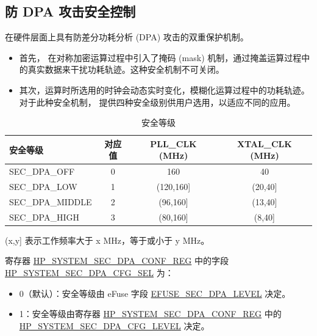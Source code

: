 \documentclass[main\_\_CN.tex]{subfiles}
\begin{document}
\subsection{防 DPA 攻击安全控制}
\label{sec:sysreg-anti-dpa-attack-security-control}

\chipname{} 在硬件层面上具有防差分功耗分析 (DPA) 攻击的双重保护机制。

\begin{itemize}
    \item 首先，\chipname{} 在对称加密运算过程中引入了掩码 (mask) 机制，通过掩盖运算过程中的真实数据来干扰功耗轨迹。这种安全机制不可关闭。
    \item 其次，运算时所选用的时钟会动态实时变化，模糊化运算过程中的功耗轨迹。对于此种安全机制，\chipname{} 提供四种安全级别供用户选用，以适应不同的应用。
\end{itemize}

\begin{table}[H]
    \centering
    \caption{安全等级}
    \label{tab:sysreg-security-level}
    \begin{threeparttable}
    \begin{tabular}[c]{| l | c | c | c |}
    \hline
    \rowcolor{lightgray}
        \textbf{安全等级} & \textbf{对应值} & \textbf{PLL\_CLK (MHz)} & \textbf{XTAL\_CLK (MHz)} \\ \hline
        SEC\_DPA\_OFF       & 0    & 160           & 40          \\\hline
        SEC\_DPA\_LOW       & 1    & (120,160]\tnote{A}   & (20,40]\tnote{A}   \\\hline
        SEC\_DPA\_MIDDLE    & 2    & (96,160]\tnote{A}    & (13,40]\tnote{A} \\\hline
        SEC\_DPA\_HIGH      & 3    & (80,160]\tnote{A}    & (8,40]\tnote{A}   \\\hline
    \end{tabular}
    \begin{tablenotes}
        \item[A] (x,y] 表示工作频率大于 x MHz，等于或小于 y MHz。
    \end{tablenotes}
    \end{threeparttable}
\end{table}

寄存器 \hyperref[regdesc:HPSYSTEMSECDPACONFREG]{HP\_SYSTEM\_SEC\_DPA\_CONF\_REG} 中的字段 \hyperref[fielddesc:HPSYSTEMSECDPALEVEL]{HP\_SYSTEM\_SEC\_DPA\_CFG\_SEL} 为：
\begin{itemize}
    \item 0（默认）：安全等级由 eFuse 字段 \hyperref[fielddesc:EFUSESECDPALEVEL]{EFUSE\_SEC\_DPA\_LEVEL} 决定。
    \item 1：安全等级由寄存器 \hyperref[regdesc:HPSYSTEMSECDPACONFREG]{HP\_SYSTEM\_SEC\_DPA\_CONF\_REG} 中的 \hyperref[fielddesc:HPSYSTEMSECDPALEVEL]{HP\_SYSTEM\_SEC\_DPA\_CFG\_LEVEL} 决定。
\end{itemize}
\end{document}
